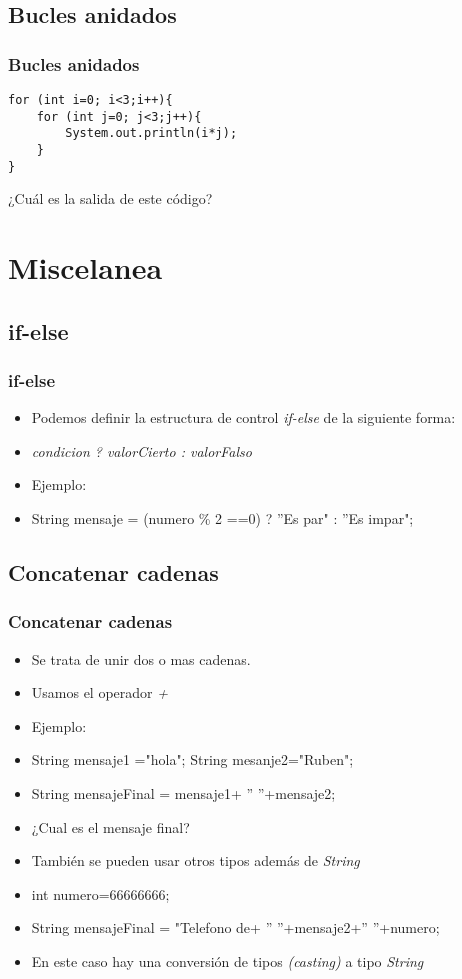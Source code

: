 \documentclass{beamer}
\begin{document}
\subsection{Bucles anidados}
\begin{frame}[fragile]
\frametitle{Bucles anidados}
\begin{verbatim}
for (int i=0; i<3;i++){
    for (int j=0; j<3;j++){
        System.out.println(i*j);
    }
}
\end{verbatim}
¿Cuál es la salida de este código?
\end{frame}


\section{Miscelanea}
\subsection{if-else}
\begin{frame}[fragile]
\frametitle{if-else}
\begin{itemize}[<+-|alert@+>]
\item Podemos definir la estructura de control \emph{if-else} de la siguiente forma:
\item \emph{condicion ? valorCierto : valorFalso}
\item Ejemplo:
\item String mensaje = (numero \% 2 ==0) ? ''Es par" : ''Es impar";
\end{itemize}
\pause
\end{frame}

\subsection{Concatenar cadenas}
\begin{frame}[fragile]
\frametitle{Concatenar cadenas}
\begin{itemize}[<+-|alert@+>]
\item Se trata de unir dos o mas cadenas.
\item Usamos el operador \emph{+}
\item Ejemplo:
\item String mensaje1 ="hola"; String mesanje2="Ruben";
\item String mensajeFinal = mensaje1+ '' ''+mensaje2;
\item ¿Cual es el mensaje final?
\item También se pueden usar otros tipos además de \emph{String}
\item int numero=66666666;
\item String mensajeFinal = "Telefono de+ '' ''+mensaje2+'' ''+numero;
\item En este caso hay una conversión de tipos \emph{(casting)} a tipo \emph{String}
\end{itemize}
\pause
\end{frame}
\end{document}
